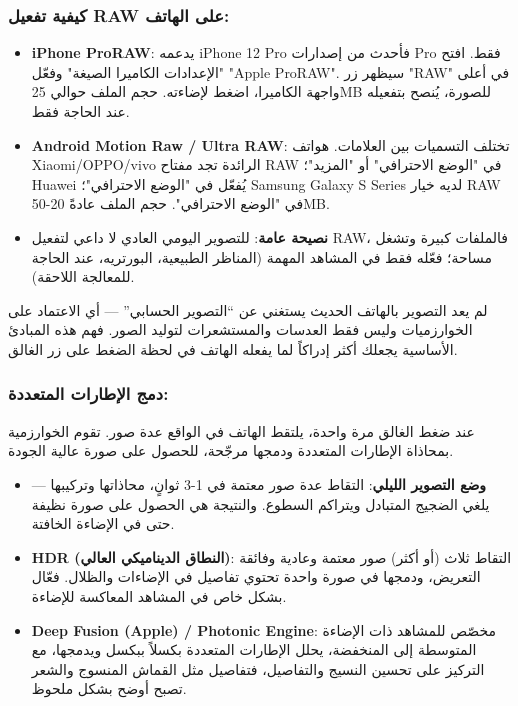 \subsubsection*{كيفية تفعيل RAW على الهاتف:}

\begin{itemize}
  \item \textbf{iPhone ProRAW}: يدعمه iPhone 12 Pro فأحدث من إصدارات Pro فقط. افتح "الإعدادات الكاميرا الصيغة" وفعّل "Apple ProRAW". سيظهر زر "RAW" في أعلى واجهة الكاميرا، اضغط لإضاءته. حجم الملف حوالي 25MB للصورة، يُنصح بتفعيله عند الحاجة فقط.
  \item \textbf{Android Motion Raw / Ultra RAW}: تختلف التسميات بين العلامات. هواتف Xiaomi/OPPO/vivo الرائدة تجد مفتاح RAW في "الوضع الاحترافي" أو "المزيد"؛ Huawei يُفعّل في "الوضع الاحترافي"؛ Samsung Galaxy S Series لديه خيار RAW في "الوضع الاحترافي". حجم الملف عادةً 20-50MB.
  \item \textbf{نصيحة عامة}: للتصوير اليومي العادي لا داعي لتفعيل RAW، فالملفات كبيرة وتشغل مساحة؛ فعّله فقط في المشاهد المهمة (المناظر الطبيعية، البورتريه، عند الحاجة للمعالجة اللاحقة).
\end{itemize}


لم يعد التصوير بالهاتف الحديث يستغني عن “التصوير الحسابي” — أي الاعتماد على الخوارزميات وليس فقط العدسات والمستشعرات لتوليد الصور. فهم هذه المبادئ الأساسية يجعلك أكثر إدراكاً لما يفعله الهاتف في لحظة الضغط على زر الغالق.

\subsubsection*{دمج الإطارات المتعددة:}

عند ضغط الغالق مرة واحدة، يلتقط الهاتف في الواقع عدة صور. تقوم الخوارزمية بمحاذاة الإطارات المتعددة ودمجها مرجّحة، للحصول على صورة عالية الجودة.

\begin{itemize}
  \item \textbf{وضع التصوير الليلي}: التقاط عدة صور معتمة في 1-3 ثوانٍ، محاذاتها وتركيبها — يلغي الضجيج المتبادل ويتراكم السطوع. والنتيجة هي الحصول على صورة نظيفة حتى في الإضاءة الخافتة.
  \item \textbf{HDR (النطاق الديناميكي العالي)}: التقاط ثلاث (أو أكثر) صور معتمة وعادية وفائقة التعريض، ودمجها في صورة واحدة تحتوي تفاصيل في الإضاءات والظلال. فعّال بشكل خاص في المشاهد المعاكسة للإضاءة.
  \item \textbf{Deep Fusion (Apple) / Photonic Engine}: مخصّص للمشاهد ذات الإضاءة المتوسطة إلى المنخفضة، يحلل الإطارات المتعددة بكسلاً ببكسل ويدمجها، مع التركيز على تحسين النسيج والتفاصيل، فتفاصيل مثل القماش المنسوج والشعر تصبح أوضح بشكل ملحوظ.
\end{itemize}

